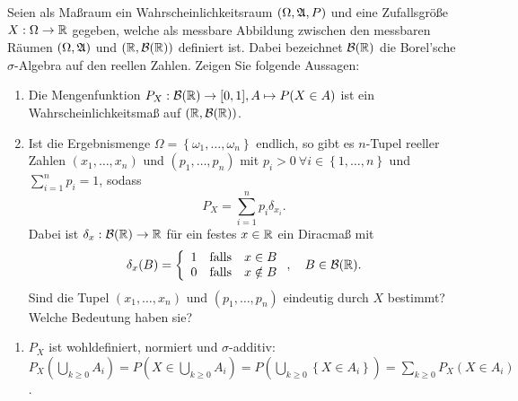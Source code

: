 Seien als Ma{\ss}raum ein Wahrscheinlichkeitsraum $\left( \Omega, \mathfrak A, P \right)$ und eine
Zufallsgröße $X: \Omega \to \mathbb R$ gegeben, welche als messbare Abbildung zwischen den messbaren R\"aumen $\left( \Omega,\mathfrak A\right)$ und  $\left( \mathbb R,\mathcal B(\mathbb R) \right)$ definiert ist.
Dabei bezeichnet $\mathcal B(\mathbb R)$ die Borel'sche $\sigma$-Algebra auf den reellen Zahlen. Zeigen Sie folgende Aussagen:
\begin{enumerate}
    \item Die Mengenfunktion $P_{X}: \mathcal B(\mathbb R) \to [0,1], A \mapsto P( X \in A
        )$ ist ein Wahrscheinlichkeitsmaß auf $(\mathbb R, \mathcal B(\mathbb R))$. 

    \item Ist die Ergebnismenge $\Omega = \left\{ \omega_{1},\dots ,\omega_{n} \right\}$ endlich,
        so gibt es $n$-Tupel reeller Zahlen $(x_1,\dots ,x_n)$ und $(p_1,\dots ,p_n)$ mit 
        $p_i>0 \ \forall i\in \left\{ 1,\dots ,n \right\}$ und $\sum_{i=1}^{n} p_i = 1$, sodass 
        \begin{equation*}
            P_X = \sum_{i=1}^{n} p_i \delta_{x_i}.
        \end{equation*}
        Dabei ist $\delta_x : \mathcal B(\mathbb R) \to \mathbb{R}$ für ein festes $x\in\mathbb R$ ein
        Diracmaß mit $$\delta_x(B)=\left\{\begin{array}{lll} 1 & \mbox{falls} & x \in B\\ 0 & \mbox{falls} & x \notin B \end{array}\right., \quad B \in \mathcal B(\mathbb R).$$
        Sind die Tupel
        $(x_1,\dots ,x_n)$ und $(p_1,\dots ,p_n)$ eindeutig durch $X$ bestimmt?
        Welche Bedeutung haben sie?
\end{enumerate}

\solution
\begin{enumerate}
    \item $P_X$ ist wohldefiniert, normiert und $\sigma$-additiv: $P_X \left( \bigcup_{k\geq 0} A_i \right) = P\left( X \in \bigcup_{k\geq 0} A_i \right)= P\left( \bigcup_{k\geq 0} \left\{ X\in A_i \right\} \right) = \sum_{k\geq 0}^{} P_X\left( X \in A_i \right)$.
\end{enumerate}

